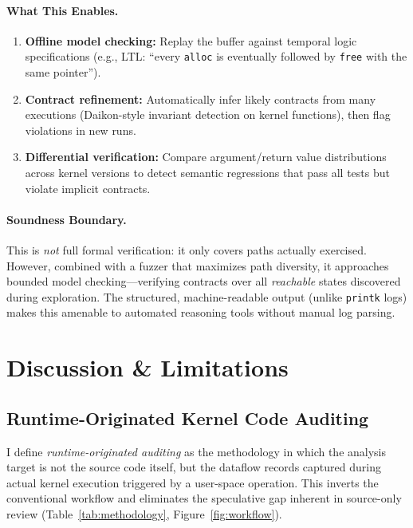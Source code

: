\documentclass{article}
\begin{document}
\paragraph{What This Enables.}
\begin{enumerate}[nosep]
  \item \textbf{Offline model checking:} Replay the buffer against temporal
        logic specifications (e.g., LTL: ``every \texttt{alloc} is eventually
        followed by \texttt{free} with the same pointer'').
  \item \textbf{Contract refinement:} Automatically infer likely contracts from
        many executions (Daikon-style invariant detection on kernel functions),
        then flag violations in new runs.
  \item \textbf{Differential verification:} Compare argument/return value
        distributions across kernel versions to detect semantic regressions
        that pass all tests but violate implicit contracts.
\end{enumerate}

\paragraph{Soundness Boundary.} This is \emph{not} full formal verification:
it only covers paths actually exercised. However, combined with a fuzzer that
maximizes path diversity, it approaches bounded model checking---verifying
contracts over all \emph{reachable} states discovered during exploration.
The structured, machine-readable output (unlike \texttt{printk} logs) makes
this amenable to automated reasoning tools without manual log parsing.

\section{Discussion \& Limitations}\label{sec:discussion}

\subsection{Runtime-Originated Kernel Code Auditing}\label{sec:workflow}

I define \emph{runtime-originated auditing} as the methodology in which the
analysis target is not the source code itself, but the dataflow records captured
during actual kernel execution triggered by a user-space operation. This inverts
the conventional workflow and eliminates the speculative gap inherent in
source-only review (Table~\ref{tab:methodology}, Figure~\ref{fig:workflow}).
\end{document}
